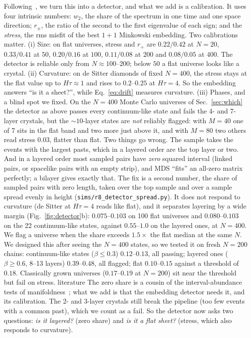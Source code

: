 \documentclass[11pt,a4paper]{article}
\newcommand{\tagbox}[2]{\textsf{\scriptsize\colorbox{#1!12}{\textcolor{#1!70!black}{#2}}}}
\newcommand{\lit}{\tagbox{blue}{literature}}
\begin{document}
Following~\cite{CloughEvans16}, we turn this into a detector, and what we add is a calibration. It uses four intrinsic numbers: $w_2$, the share of the spectrum in one time and one space direction; $r_\pm$, the ratio of the second to the first eigenvalue of each sign; and the \emph{stress}, the rms misfit of the best $1+1$ Minkowski embedding. Two calibrations matter. (i) Size: on flat universes, stress and $r_+$ are $0.22/0.42$ at $N=20$, $0.33/0.41$ at $50$, $0.20/0.16$ at $100$, $0.11/0.08$ at $200$ and $0.08/0.05$ at $400$. The detector is reliable only from $N\approx100$--$200$; below $50$ a flat universe looks like a crystal. (ii) Curvature: on de Sitter diamonds of fixed $N=400$, the stress stays at the flat value up to $H\tau\approx1$ and rises to $0.2$--$0.25$ at $H\tau=4$. So the embedding answers ``is it a sheet?'', while Eq.~\eqref{eq:drift} measures curvature. (iii) Phases, and a blind spot we fixed. On the $N=400$ Monte Carlo universes of Sec.~\ref{sec:which} the detector as above passes every continuum-like state and fails the 4- and 7-layer crystals, but the $\sim10$-layer states are \emph{not} reliably flagged: with $M=40$ one of 7 sits in the flat band and two more just above it, and with $M=80$ two others read stress $0.03$, flatter than flat. Two things go wrong. The sample takes the events with the largest pasts, which in a layered order are the top layer or two. And in a layered order most sampled pairs have \emph{zero} squared interval (linked pairs, or spacelike pairs with an empty strip), and MDS ``fits'' an all-zero matrix perfectly; a bilayer gives exactly that. The fix is a second number, the share of sampled pairs with zero length, taken over the top sample and over a sample spread evenly in height (\texttt{sims/r8\_detector\_spread.py}). It does not respond to curvature (de Sitter at $H\tau=4$ reads like flat), and it separates layering by a wide margin (Fig.~\ref{fig:detector}b): $0.075$--$0.103$ on 100 flat universes and $0.080$--$0.103$ on the 22 continuum-like states, against $0.55$--$1.0$ on the layered ones, at $N=400$. We flag a universe when the share exceeds $1.5\times$ the flat median at the same $N$. We designed this after seeing the $N=400$ states, so we tested it on fresh $N=200$ chains: continuum-like states ($\beta\le0.3$) $0.12$--$0.13$, all passing; layered ones ($\beta\ge0.6$, 8--13 layers) $0.39$--$0.48$, all flagged; flat $0.10$--$0.15$ against a threshold of $0.18$. Classically grown universes ($0.17$--$0.19$ at $N=200$) sit near the threshold but fail on stress. \lit{} The zero share is a cousin of the interval-abundance tests of manifoldness~\cite{GlaserSurya13}; what we add is that the embedding detector needs it, and its calibration. The 2- and 3-layer crystals still break the pipeline (too few events with a common past), which we count as a fail. So the detector now asks two questions: \emph{is it layered?} (zero share) and \emph{is it a flat sheet?} (stress, which also responds to curvature).
\end{document}
